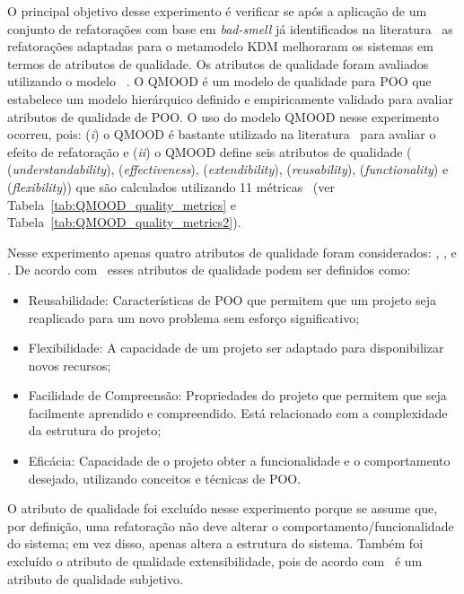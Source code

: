 O principal objetivo desse experimento é verificar se após a aplicação de um conjunto de refatorações com base em \textit{bad-smell} já identificados na literatura~\cite{Kessentini_2011, Ouni_2013, Moha_2010, Kessentini_2010} as refatorações adaptadas para o metamodelo KDM melhoraram os sistemas em termos de atributos de qualidade. Os atributos de qualidade foram avaliados utilizando o modelo ~\cite{Bansiya_QMOOD}. O QMOOD é um modelo de qualidade para POO que estabelece um modelo hierárquico definido e empiricamente validado para avaliar atributos de qualidade de POO. O uso do modelo QMOOD nesse experimento ocorreu, pois: (\textit{i}) o QMOOD é bastante utilizado na literatura~\cite{Keeffe_2008, Seng_2006, Jensen_2010} para avaliar o efeito de refatoração e (\textit{ii}) o QMOOD define seis atributos de qualidade ( (\textit{understandability}),  (\textit{effectiveness}),  (\textit{extendibility}),  (\textit{reusability}),  (\textit{functionality}) e  (\textit{flexibility})) que são calculados utilizando 11 métricas~\cite{Bansiya_QMOOD} (ver Tabela~\ref{tab:QMOOD_quality_metrics} e Tabela~\ref{tab:QMOOD_quality_metrics2}). 


Nesse experimento apenas quatro atributos de qualidade foram considerados: , ,  e . De acordo com~ esses atributos de qualidade podem ser definidos como: 

\begin{itemize}
\item Reusabilidade: Características de POO que permitem que um projeto seja reaplicado para um novo problema sem esforço significativo;
\item Flexibilidade: A capacidade de um projeto ser adaptado para disponibilizar novos recursos;
\item Facilidade de Compreensão: Propriedades do projeto que permitem que seja facilmente aprendido e compreendido. Está relacionado com a complexidade da estrutura do projeto;
\item Eficácia: Capacidade de o projeto obter a funcionalidade e o comportamento desejado, utilizando conceitos e técnicas de POO.
\end{itemize}

O atributo de qualidade  foi excluído nesse experimento porque se assume que, por definição, uma refatoração não deve alterar o comportamento/funcionalidade do sistema; em vez disso, apenas altera a estrutura do sistema. Também foi excluído o atributo de qualidade extensibilidade, pois de acordo com~ é um atributo de qualidade subjetivo. 

